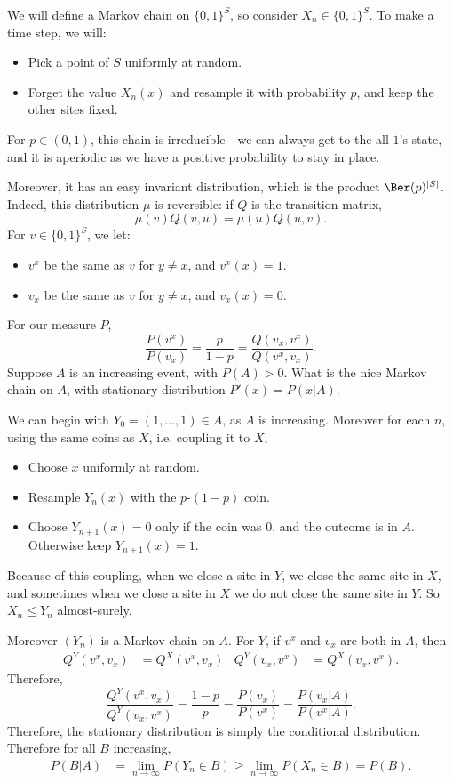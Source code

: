 \documentclass[12pt]{article}
\begin{document}
\begin{proofbox}
	We will define a Markov chain on $\{0, 1\}^{S}$, so consider $X_n \in \{0, 1\}^{S}$. To make a time step, we will:
	\begin{itemize}
		\item Pick a point of $S$ uniformly at random.
		\item Forget the value $X_n(x)$ and resample it with probability $p$, and keep the other sites fixed.
	\end{itemize}
	For $p \in (0, 1)$, this chain is irreducible - we can always get to the all $1$'s state, and it is aperiodic as we have a positive probability to stay in place.

	Moreover, it has an easy invariant distribution, which is the product $\Ber(p)^{|S|}$. Indeed, this distribution $\mu$ is reversible: if $Q$ is the transition matrix,
	\[
	\mu(v)  Q(v, u) = \mu(u) Q(u, v).
	\]
	For $v \in \{0, 1\}^{S}$, we let:
	\begin{itemize}
		\item $v^{x}$ be the same as $v$ for $y \neq x$, and $v^{x}(x) = 1$.
		\item $v_x$ be the same as $v$ for $y \neq x$, and $v_x(x) = 0$.
	\end{itemize}
	For our measure $P$,
	\[
	\frac{P(v^{x})}{P(v_x)} = \frac{p}{1-p} = \frac{Q(v_x, v^{x})}{Q(v^{x},v_x)}.
	\]
	Suppose $A$ is an increasing event, with $P(A) > 0$. What is the nice Markov chain on $A$, with stationary distribution $P'(x)= P(x|A)$.

	We can begin with $Y_0 = (1, \ldots, 1) \in A$, as $A$ is increasing. Moreover for each $n$, using the same coins as $X$, i.e. coupling it to $X$,
	\begin{itemize}
		\item Choose $x$ uniformly at random.
		\item Resample $Y_n(x)$ with the $p$-$(1-p)$ coin.
		\item Choose $Y_{n+1}(x) = 0$ only if the coin was $0$, and the outcome is in $A$. Otherwise keep $Y_{n+1}(x) = 1$.
	\end{itemize}
	Because of this coupling, when we close a site in $Y$, we close the same site in $X$, and sometimes when we close a site in $X$ we do not close the same site in $Y$. So $X_n \leq Y_n$ almost-surely.

	Moreover $(Y_n)$ is a Markov chain on $A$. For $Y$, if $v^{x}$ and $v_x$ are both in $A$, then
	\begin{align*}
		Q^Y(v^x, v_x) &= Q^X(v^x, v_x) & Q^Y(v_x, v^x) &= Q^X(v_x, v^x).
	\end{align*}
	Therefore,
	\[
	\frac{Q^Y(v^x, v_x)}{Q^Y(v_x,v^x)} = \frac{1-p}{p} = \frac{P(v_x)}{P(v^x)} = \frac{P(v_x|A)}{P(v^x|A)}.
	\]
	Therefore, the stationary distribution is simply the conditional distribution. Therefore for all $B$ increasing,
	\begin{align*}
		P(B|A) &= \lim_{n \to \infty} P(Y_n \in B) \geq \lim_{n \to \infty}P(X_n \in B) = P(B).
	\end{align*}
\end{proofbox}
\end{document}
